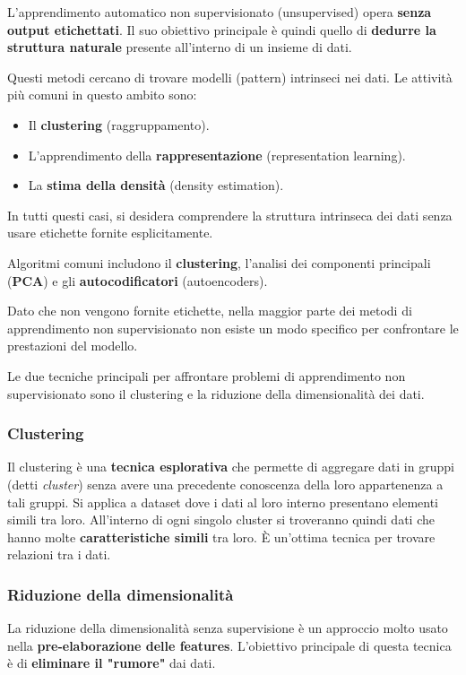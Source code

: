 L'apprendimento automatico non supervisionato (unsupervised)
opera \textbf{senza output etichettati}. Il suo
obiettivo principale è quindi quello di \textbf{dedurre la
struttura naturale} presente all'interno di un insieme di
dati.

Questi metodi cercano di trovare modelli (pattern) intrinseci
nei dati. Le attività più comuni in questo ambito
sono:
\begin{itemize}
    \item Il \textbf{clustering} (raggruppamento).
    \item L'apprendimento della \textbf{rappresentazione}
    (representation learning).
    \item La \textbf{stima della densità} (density estimation).
\end{itemize}
In tutti questi casi, si desidera comprendere la struttura
intrinseca dei dati senza usare etichette fornite
esplicitamente.

Algoritmi comuni includono il \textbf{clustering}, l'analisi
dei componenti principali (\textbf{PCA}) e gli
\textbf{autocodificatori} (autoencoders).

Dato che non vengono fornite etichette, nella maggior parte
dei metodi di apprendimento non supervisionato non esiste un
modo specifico per confrontare le prestazioni del modello.

Le due tecniche principali per affrontare problemi di
apprendimento non supervisionato sono il clustering
e la riduzione della dimensionalità dei dati.

\subsubsection{Clustering}

Il clustering è una \textbf{tecnica esplorativa} che permette di
aggregare dati in gruppi (detti \textit{cluster}) senza avere
una precedente conoscenza della loro appartenenza a tali
gruppi. Si applica a dataset dove i dati al loro
interno presentano elementi simili tra loro.
All'interno di ogni singolo cluster si troveranno quindi dati
che hanno molte \textbf{caratteristiche simili} tra loro.
È un'ottima tecnica per trovare relazioni tra i dati.

\subsubsection{Riduzione della dimensionalità}

La riduzione della dimensionalità senza supervisione è un
approccio molto usato nella \textbf{pre-elaborazione delle
features}. L'obiettivo principale di questa tecnica è
di \textbf{eliminare il "rumore"} dai dati.

